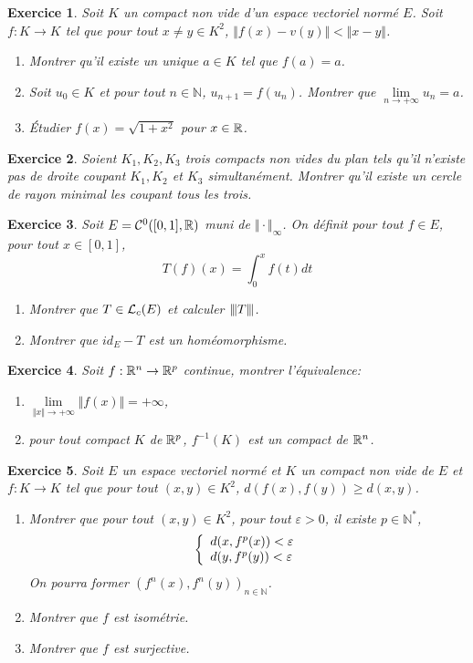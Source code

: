 \documentclass[12pt]{article}
\newtheorem{exercise}{Exercice}[section]
\theoremstyle{remark}
\theoremstyle{remark}
\newcommand{\N}{\mathbb{N}} \newcommand{\Z}{\mathbb{Z}}
\newcommand{\vertiii}[1]{{\left\vert\kern-0.25ex\left\vert\kern-0.25ex\left\vert{}#1
\right\vert\kern-0.25ex\right\vert\kern-0.25ex\right\vert}}
\begin{document}
\begin{exercise}
	Soit $K$ un compact non vide d'un espace vectoriel normé $E$. Soit $f\colon K\to K$ tel que pour tout $x\neq y\in K^{2}$, $\Vert f(x)-v(y)\Vert<\Vert x-y\Vert$.
	\begin{enumerate}
		\item Montrer qu'il existe un unique $a\in K$ tel que $f(a)=a$.
		\item Soit $u_{0}\in K$ et pour tout $n\in\N$, $u_{n+1}=f(u_{n})$. Montrer que $\lim\limits_{n\to+\infty}u_{n}=a$.
		\item Étudier $f(x)=\sqrt{1+x^{2}}$ pour $x\in\mathbb{R}$.
	\end{enumerate}
\end{exercise}

\begin{exercise}
	Soient $K_{1},K_{2},K_{3}$ trois compacts non vides du plan tels qu'il n'existe pas de droite coupant $K_{1},K_{2}$ et $K_{3}$ simultanément. Montrer qu'il existe un cercle de rayon minimal les coupant tous les trois.
\end{exercise}

\begin{exercise}
	Soit $E=\mathcal{C}^{0}([0,1],\mathbb{R})$ muni de $\Vert\cdot\Vert_{\infty}$. On définit pour tout $f\in E$, pour tout $x\in[0,1]$, 
	$$T(f)(x)=\int_{0}^{x}f(t)dt$$
	\begin{enumerate}
		\item Montrer que $T\in\mathcal{L}_{c}(E)$ et calculer $\vertiii{T}$.
		\item Montrer que $id_{E}-T$ est un homéomorphisme.
	\end{enumerate}
\end{exercise}

\begin{exercise}
	Soit $f:\mathbb{R}^{n}\to\mathbb{R}^{p}$ continue, montrer l'équivalence:
	\begin{enumerate}
		\item [(i)] $\lim\limits_{\Vert x\Vert\to+\infty}\Vert f(x)\Vert=+\infty$,
		\item [(ii)] pour tout compact $K$ de $\mathbb{R}^{p}$, $f^{-1}(K)$ est un compact de $\mathbb{R}^{n}$.
	\end{enumerate}
\end{exercise}

\begin{exercise}
	Soit $E$ un espace vectoriel normé et $K$ un compact non vide de $E$ et $f:K\to K$ tel que pour tout $(x,y)\in K^{2}$, $d(f(x),f(y))\geqslant d(x,y)$.
	\begin{enumerate}
		\item Montrer que pour tout $(x,y)\in K^{2}$, pour tout $\varepsilon>0$, il existe $p\in\N^{*}$,
		$$
		\left\{
			\begin{array}[]{l}
				d(x,f^{p}(x))<\varepsilon\\
				d(y,f^{p}(y))<\varepsilon
			\end{array}
		\right.
		$$
		On pourra former $(f^{n}(x),f^{n}(y))_{n\in\N}$.
		\item Montrer que $f$ est isométrie.
		\item Montrer que $f$ est surjective.
	\end{enumerate}
\end{exercise}
\end{document}
